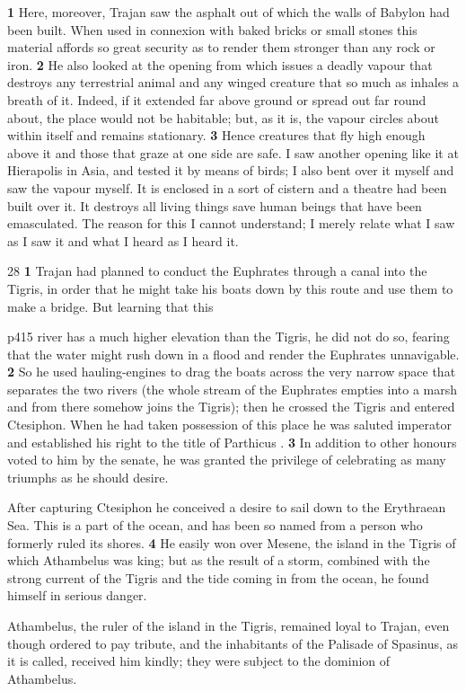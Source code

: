 \textbf{1} Here, moreover, Trajan saw the asphalt out of which the walls of Babylon had been built. When used in connexion with baked bricks or small stones this material affords so great security as to render them stronger than any rock or iron. \textbf{2} He also looked at the opening from which issues a deadly vapour that destroys any terrestrial animal and any winged creature that so much as inhales a breath of it. Indeed, if it extended far above ground or spread out far round about, the place would not be habitable; but, as it is, the vapour circles about within itself and remains stationary. \textbf{3} Hence creatures that fly high enough above it and those that graze at one side are safe. I saw another opening like it at Hierapolis in Asia, and tested it by means of birds; I also bent over it myself and saw the vapour myself. It is enclosed in a sort of cistern and a theatre had been built over it. It destroys all living things save human beings that have been emasculated. The reason for this I cannot understand; I merely relate what I saw as I saw it and what I heard as I heard it.

28
\textbf{1} Trajan had planned to conduct the Euphrates through a canal into the Tigris, in order that he might take his boats down by this route and use them to make a bridge. But learning that this

p415 river has a much higher elevation than the Tigris, he did not do so, fearing that the water might rush down in a flood and render the Euphrates unnavigable. \textbf{2} So he used hauling-engines to drag the boats across the very narrow space that separates the two rivers (the whole stream of the Euphrates empties into a marsh and from there somehow joins the Tigris); then he crossed the Tigris and entered Ctesiphon. When he had taken possession of this place he was saluted imperator and established his right to the title of Parthicus . \textbf{3} In addition to other honours voted to him by the senate, he was granted the privilege of celebrating as many triumphs as he should desire.

After capturing Ctesiphon he conceived a desire to sail down to the Erythraean Sea. This is a part of the ocean, and has been so named from a person who formerly ruled its shores. \textbf{4} He easily won over Mesene, the island in the Tigris of which Athambelus was king; but as the result of a storm, combined with the strong current of the Tigris and the tide coming in from the ocean, he found himself in serious danger.

Athambelus, the ruler of the island in the Tigris, remained loyal to Trajan, even though ordered to pay tribute, and the inhabitants of the Palisade of Spasinus, as it is called, received him kindly; they were subject to the dominion of Athambelus.

